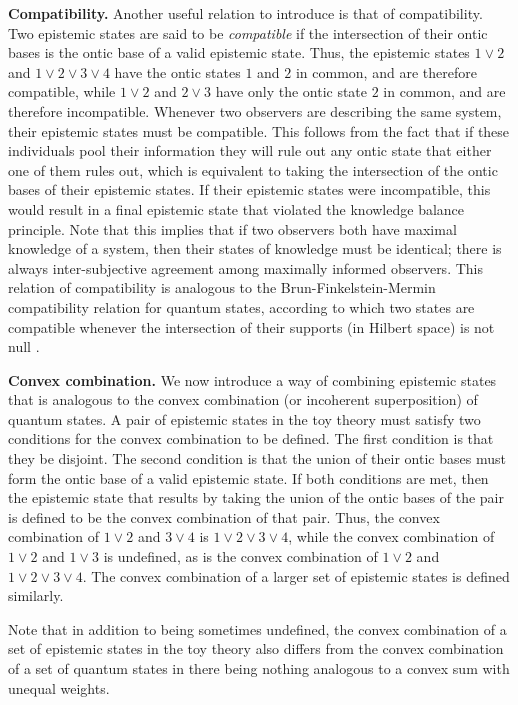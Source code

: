 \documentclass[pra,nofootinbib,showpacs,12pt]{revtex4}
\begin{document}
\textbf{Compatibility.} Another useful relation to introduce is that of
compatibility. Two epistemic states are said to be \emph{compatible} if the
intersection of their ontic bases is the ontic base of a valid epistemic
state. Thus, the epistemic states $1\vee 2$ and $1\vee 2\vee 3\vee 4$ have
the ontic states $1$ and $2$ in common, and are therefore compatible, while $%
1\vee 2$ and $2\vee 3$ have only the ontic state $2$ in common, and are
therefore incompatible. Whenever two observers are describing the same
system, their epistemic states must be compatible. This follows from the
fact that if these individuals pool their information they will rule out any
ontic state that either one of them rules out, which is equivalent to taking
the intersection of the ontic bases of their epistemic states. If their
epistemic states were incompatible, this would result in a final epistemic
state that violated the knowledge balance principle. Note that this implies
that if two observers both have maximal knowledge of a system, then their
states of knowledge must be identical; there is always inter-subjective
agreement among maximally informed observers. This relation of compatibility
is analogous to the Brun-Finkelstein-Mermin compatibility relation for
quantum states, according to which two states are compatible whenever the
intersection of their supports (in Hilbert space) is not null \cite{BFM}.

\textbf{Convex combination.} We now introduce a way of combining epistemic
states that is analogous to the convex combination (or incoherent
superposition) of quantum states. A pair of epistemic states in the toy
theory must satisfy two conditions for the convex combination to be defined.
The first condition is that they be disjoint. The second condition is that
the union of their ontic bases must form the ontic base of a valid epistemic
state. If both conditions are met, then the epistemic state that results by
taking the union of the ontic bases of the pair is defined to be the convex
combination of that pair. Thus, the convex combination of $1\vee 2$ and $%
3\vee 4$ is $1\vee 2\vee 3\vee 4$, while the convex combination of $1\vee 2$
and $1\vee 3$ is undefined, as is the convex combination of $1\vee 2$ and $%
1\vee 2\vee 3\vee 4$. The convex combination of a larger set of epistemic
states is defined similarly.

Note that in addition to being sometimes undefined, the convex combination
of a set of epistemic states in the toy theory also differs from the convex
combination of a set of quantum states in there being nothing analogous to a
convex sum with unequal weights.
\end{document}

